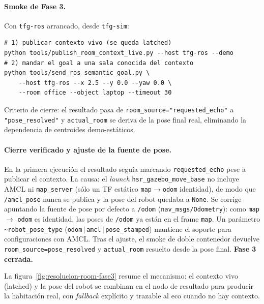 \documentclass[11pt,a4paper]{article}
\begin{document}
\paragraph{Smoke de Fase 3.} Con \texttt{tfg-ros} arrancado, desde
\texttt{tfg-sim}:

\begin{verbatim}
# 1) publicar contexto vivo (se queda latched)
python tools/publish_room_context_live.py --host tfg-ros --demo
# 2) mandar el goal a una sala conocida del contexto
python tools/send_ros_semantic_goal.py \
    --host tfg-ros --x 2.5 --y 0.0 --yaw 0.0 \
    --room office --object laptop --timeout 30
\end{verbatim}

Criterio de cierre: el resultado pasa de \texttt{room\_source="requested\_echo"}
a \texttt{"pose\_resolved"} y \texttt{actual\_room} se deriva de la pose final
real, eliminando la dependencia de centroides demo-estáticos.

\paragraph{Cierre verificado y ajuste de la fuente de pose.} En la primera
ejecución el resultado seguía marcando \texttt{requested\_echo} pese a publicar
el contexto. La causa: el \emph{launch} \texttt{hsr\_gazebo\_move\_base} no
incluye AMCL ni \texttt{map\_server} (sólo un TF estático
\texttt{map}$\rightarrow$\texttt{odom} identidad), de modo que
\texttt{/amcl\_pose} nunca se publica y la pose del robot quedaba a
\texttt{None}. Se corrige apuntando la fuente de pose por defecto a
\texttt{/odom} (\texttt{nav\_msgs/Odometry}): como \texttt{map}$\rightarrow$%
\texttt{odom} es identidad, las poses de \texttt{/odom} ya están en el frame
\texttt{map}. Un parámetro \texttt{\~{}robot\_pose\_type}
(\texttt{odom}\,$|$\,\texttt{amcl}\,$|$\,\texttt{pose\_stamped}) mantiene el
soporte para configuraciones con AMCL. Tras el ajuste, el smoke de doble
contenedor devuelve \texttt{room\_source=pose\_resolved} y
\texttt{actual\_room} resuelto desde la pose final. \textbf{Fase 3 cerrada.}

La figura~\ref{fig:resolucion-room-fase3} resume el mecanismo: el contexto vivo
(latched) y la pose del robot se combinan en el nodo de resultado para producir
la habitación real, con \emph{fallback} explícito y trazable al eco cuando no
hay contexto.
\end{document}
